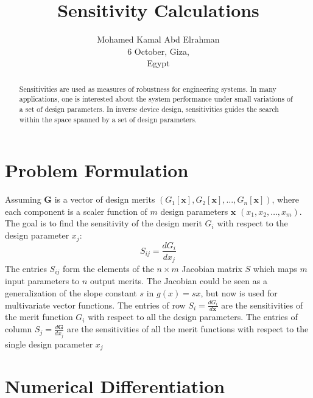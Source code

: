 \documentclass{tufte-handout}
\title{Sensitivity Calculations}
\author[mohamedkamal]{Mohamed Kamal Abd Elrahman \\
6 October, Giza,\\ Egypt}
\begin{document}
	\maketitle
	\begin{abstract}
		\noindent 
	Sensitivities are used as measures of robustness for engineering systems. In many applications, one is interested about the system performance under small variations of a set of design parameters. In inverse device design, sensitivities guides the search within the space spanned by a set of design parameters.  
	\end{abstract}
\section{Problem Formulation}	
 Assuming $\mathbf{G}$	is a vector of design merits $ (G_1[\mathbf{x}], G_2[\mathbf{x}], \dots,G_n[\mathbf{x}]) $, where each component is a scaler function of $m$ design parameters $\mathbf{x}$	$ (x_1,x_2,\dots, x_m)$. The goal is to find the sensitivity of the design merit $G_i$  with respect to the design parameter $x_j$:
	 \begin{equation}
	 S_{ij} = \frac{d G_i}{dx_j}
	 \end{equation}
The entries $S_{ij}$ form the elements of the  $n \times m$  Jacobian matrix $S$ which maps $m$ input parameters to $n$ output merits.   The Jacobian could be seen as a generalization of the slope constant $s$ in $g(x) = s x$, but now is used for multivariate vector functions. The entries of row $S_i = \frac{d G_i}{d \mathbf{x}}$ are the sensitivities of the merit function $G_i$ with respect to all the design parameters. The entries of column $S_j = \frac{d \mathbf{G}}{d x_j}$ are the sensitivities of all the merit functions with respect to the single design parameter $x_j$  
\section{Numerical Differentiation}
\end{document}
